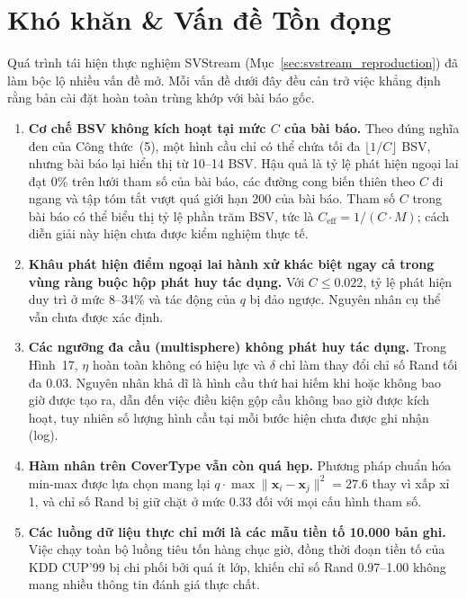 \section{Khó khăn \& Vấn đề Tồn đọng}
\label{sec:issues}

Quá trình tái hiện thực nghiệm SVStream (Mục~\ref{sec:svstream_reproduction}) đã làm bộc lộ nhiều vấn đề mở. Mỗi vấn đề dưới đây đều cản trở việc khẳng định rằng bản cài đặt hoàn toàn trùng khớp với bài báo gốc.

\begin{enumerate}[label=\textbf{B\arabic*.},leftmargin=2.2em,itemsep=3pt]
  \item \textbf{Cơ chế BSV không kích hoạt tại mức $C$ của bài báo.} Theo đúng nghĩa đen của Công thức~(5), một hình cầu chỉ có thể chứa tối đa $\lfloor 1/C \rfloor$ BSV, nhưng bài báo lại hiển thị từ 10--14 BSV. Hậu quả là tỷ lệ phát hiện ngoại lai đạt 0\% trên lưới tham số của bài báo, các đường cong biến thiên theo $C$ đi ngang và tập tóm tắt vượt quá giới hạn 200 của bài báo. Tham số $C$ trong bài báo có thể biểu thị tỷ lệ phần trăm BSV, tức là $C_{\text{eff}} = 1/(C \cdot M)$; cách diễn giải này hiện chưa được kiểm nghiệm thực tế.
  \item \textbf{Khâu phát hiện điểm ngoại lai hành xử khác biệt ngay cả trong vùng ràng buộc hộp phát huy tác dụng.} Với $C \le 0.022$, tỷ lệ phát hiện duy trì ở mức 8--34\% và tác động của $q$ bị đảo ngược. Nguyên nhân cụ thể vẫn chưa được xác định.
  \item \textbf{Các ngưỡng đa cầu (multisphere) không phát huy tác dụng.} Trong Hình~17, $\eta$ hoàn toàn không có hiệu lực và $\delta$ chỉ làm thay đổi chỉ số Rand tối đa 0.03. Nguyên nhân khả dĩ là hình cầu thứ hai hiếm khi hoặc không bao giờ được tạo ra, dẫn đến việc điều kiện gộp cầu không bao giờ được kích hoạt, tuy nhiên số lượng hình cầu tại mỗi bước hiện chưa được ghi nhận (log).
  \item \textbf{Hàm nhân trên CoverType vẫn còn quá hẹp.} Phương pháp chuẩn hóa min-max được lựa chọn mang lại $q \cdot \max\|\mathbf{x}_i-\mathbf{x}_j\|^2 = 27.6$ thay vì xấp xỉ 1, và chỉ số Rand bị giữ chặt ở mức 0.33 đối với mọi cấu hình tham số.
  \item \textbf{Các luồng dữ liệu thực chỉ mới là các mẫu tiền tố 10.000 bản ghi.} Việc chạy toàn bộ luồng tiêu tốn hàng chục giờ, đồng thời đoạn tiền tố của KDD CUP'99 bị chi phối bởi quá ít lớp, khiến chỉ số Rand 0.97--1.00 không mang nhiều thông tin đánh giá thực chất.

\end{enumerate}
